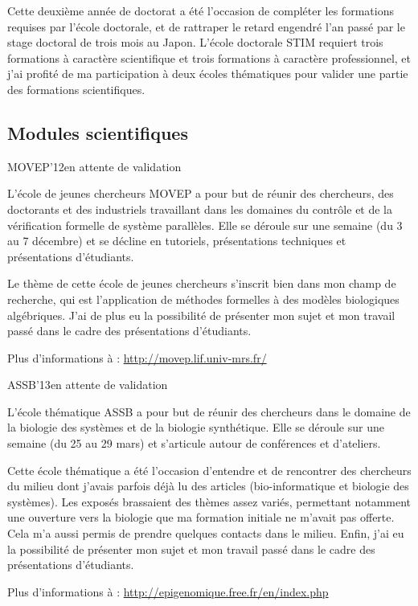 Cette deuxième année de doctorat a été l'occasion de compléter les formations requises par l'école doctorale,
et de rattraper le retard engendré l'an passé par le stage doctoral de trois mois au Japon.
L'école doctorale STIM requiert trois formations à caractère scientifique et trois formations à caractère professionnel,
et j'ai profité de ma participation à deux écoles thématiques pour valider une partie des formations scientifiques.

\subsection{Modules scientifiques}

\formation
{MOVEP'12}{en attente de validation}
{L'école de jeunes chercheurs MOVEP a pour but de réunir des chercheurs, des doctorants et des industriels travaillant dans les domaines du contrôle et de la vérification formelle de système parallèles. Elle se déroule sur une semaine (du 3 au 7 décembre) et se décline en tutoriels, présentations techniques et présentations d'étudiants.

Le thème de cette école de jeunes chercheurs s'inscrit bien dans mon champ de recherche, qui est l'application de méthodes formelles à des modèles biologiques algébriques. J'ai de plus eu la possibilité de présenter mon sujet et mon travail passé dans le cadre des présentations d'étudiants.

Plus d'informations à : \url{http://movep.lif.univ-mrs.fr/}}

\formation
{ASSB'13}{en attente de validation}
{L'école thématique ASSB a pour but de réunir des chercheurs dans le domaine de la biologie des systèmes et de la biologie synthétique. Elle se déroule sur une semaine (du 25 au 29 mars) et s'articule autour de conférences et d'ateliers.

Cette école thématique a été l'occasion d'entendre et de rencontrer des chercheurs du milieu dont j'avais parfois déjà lu des articles (bio-informatique et biologie des systèmes). Les exposés brassaient des thèmes assez variés, permettant notamment une ouverture vers la biologie que ma formation initiale ne m'avait pas offerte. Cela m'a aussi permis de prendre quelques contacts dans le milieu. Enfin, j'ai eu la possibilité de présenter mon sujet et mon travail passé dans le cadre des présentations d'étudiants.

Plus d'informations à : \url{http://epigenomique.free.fr/en/index.php}}

